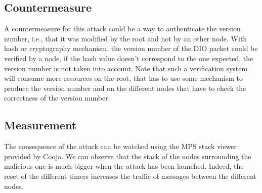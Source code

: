 \documentclass{report}
\begin{document}
\subsection*{Countermeasure}
A countermeasure for this attack could be a way to authenticate the version number, i.e., that it was modified by the root and not by an other node. With hash or cryptography mechanism, the version number of the DIO packet could be verified by a node, if the hash value doesn't correspond to the one expected, the version number is not taken into account. Note that such a verification system will consume more resources on the root, that has to use some mechanism to produce the version number and on the different nodes that have to check the correctness of the version number.
\subsection*{Measurement }
The consequence of the attack can be watched using the MPS stack viewer provided by Cooja. We can observe that the stack of the nodes surrounding the malicious one is much bigger when the attack has been launched. Indeed, the reset of the different timers increases the traffic of messages between the different nodes.\\
\end{document}
